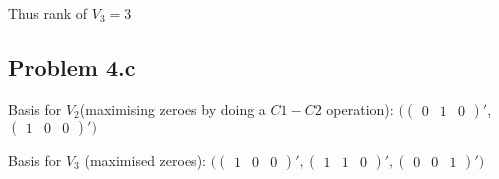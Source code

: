 \documentclass[a4paper]{article}
\begin{document}
Thus rank of $V_3=3$

\subsection*{Problem 4.c}

Basis for $V_2$(maximising zeroes by doing a $C1-C2$ operation):  $\big(\begin{pmatrix} 0 & 1 & 0 \end{pmatrix}'$, $\begin{pmatrix} 1 & 0 & 0\end{pmatrix}'\big)$ 

Basis for $V_3$ (maximised zeroes): $\big(\begin{pmatrix}1 & 0 & 0 \end{pmatrix}',\begin{pmatrix}1 & 1 & 0 \end{pmatrix}',\begin{pmatrix}0 & 0 & 1 \end{pmatrix}'\big)$
\end{document}
